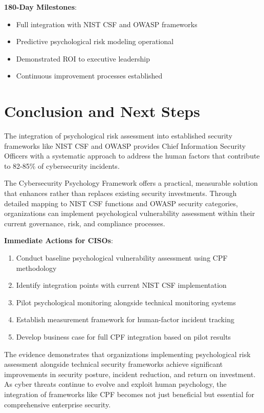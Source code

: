 \documentclass[11pt,a4paper]{article}
\begin{document}
\textbf{180-Day Milestones}:
\begin{itemize}
\item Full integration with NIST CSF and OWASP frameworks
\item Predictive psychological risk modeling operational
\item Demonstrated ROI to executive leadership
\item Continuous improvement processes established
\end{itemize}

\section{Conclusion and Next Steps}

The integration of psychological risk assessment into established security frameworks like NIST CSF and OWASP provides Chief Information Security Officers with a systematic approach to address the human factors that contribute to 82-85\% of cybersecurity incidents.

The Cybersecurity Psychology Framework offers a practical, measurable solution that enhances rather than replaces existing security investments. Through detailed mapping to NIST CSF functions and OWASP security categories, organizations can implement psychological vulnerability assessment within their current governance, risk, and compliance processes.

\textbf{Immediate Actions for CISOs}:
\begin{enumerate}
\item Conduct baseline psychological vulnerability assessment using CPF methodology
\item Identify integration points with current NIST CSF implementation
\item Pilot psychological monitoring alongside technical monitoring systems
\item Establish measurement framework for human-factor incident tracking
\item Develop business case for full CPF integration based on pilot results
\end{enumerate}

The evidence demonstrates that organizations implementing psychological risk assessment alongside technical security frameworks achieve significant improvements in security posture, incident reduction, and return on investment. As cyber threats continue to evolve and exploit human psychology, the integration of frameworks like CPF becomes not just beneficial but essential for comprehensive enterprise security.
\end{document}
